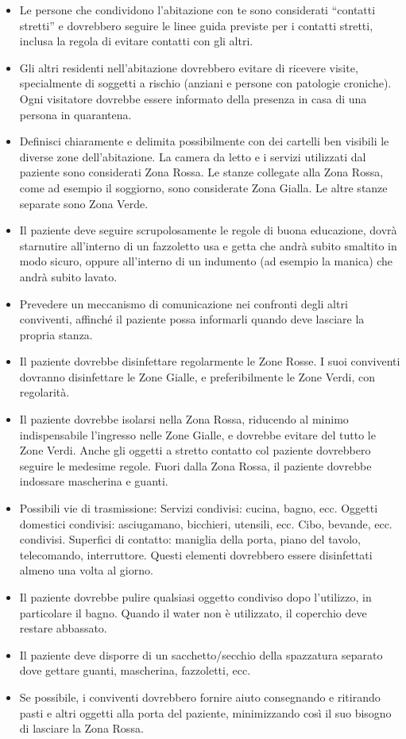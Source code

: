 \documentclass[onecolumn,journal]{IEEEtran}
\begin{document}
\begin{multicols}{2}
\begin{itemize}
  \item Le persone che condividono l’abitazione con te sono considerati “contatti stretti” e dovrebbero seguire le linee guida previste per i contatti stretti, inclusa la regola di evitare contatti con gli altri.
  \item Gli altri residenti nell’abitazione dovrebbero evitare di ricevere visite, specialmente di soggetti a rischio (anziani e persone con patologie croniche). Ogni visitatore dovrebbe essere informato della presenza in casa di una persona in quarantena.
  \item Definisci chiaramente e delimita possibilmente con dei cartelli ben visibili le diverse zone dell’abitazione. La camera da letto e i servizi utilizzati dal paziente sono considerati Zona Rossa. Le stanze collegate alla Zona Rossa, come ad esempio il soggiorno, sono considerate Zona Gialla. Le altre stanze separate sono Zona Verde.
  \item Il paziente deve seguire scrupolosamente le regole di buona educazione, dovrà starnutire all’interno di un fazzoletto usa e getta che andrà subito smaltito in modo sicuro, oppure all’interno di un indumento (ad esempio la manica) che andrà subito lavato.
  \item Prevedere un meccanismo di comunicazione nei confronti degli altri conviventi, affinché il paziente possa informarli quando deve lasciare la propria stanza.
  \item Il paziente dovrebbe disinfettare regolarmente le Zone Rosse. I suoi conviventi dovranno disinfettare le Zone Gialle, e preferibilmente le Zone Verdi, con regolarità.
  \item Il paziente dovrebbe isolarsi nella Zona Rossa, riducendo al minimo indispensabile l’ingresso nelle Zone Gialle, e dovrebbe evitare del tutto le Zone Verdi. Anche gli oggetti a stretto contatto col paziente dovrebbero seguire le medesime regole. Fuori dalla Zona Rossa, il paziente dovrebbe indossare mascherina e guanti.
  \item Possibili vie di trasmissione: Servizi condivisi: cucina, bagno, ecc. Oggetti domestici condivisi: asciugamano, bicchieri, utensili, ecc. Cibo, bevande, ecc. condivisi. Superfici di contatto: maniglia della porta, piano del tavolo, telecomando, interruttore. Questi elementi dovrebbero essere disinfettati almeno una volta al giorno.
  \item Il paziente dovrebbe pulire qualsiasi oggetto condiviso dopo l’utilizzo, in particolare il bagno. Quando il water non è utilizzato, il coperchio deve restare abbassato.
  \item Il paziente deve disporre di un sacchetto/secchio della spazzatura separato dove gettare guanti, mascherina, fazzoletti, ecc.
  \item Se possibile, i conviventi dovrebbero fornire aiuto consegnando e ritirando pasti e altri oggetti alla porta del paziente, minimizzando così il suo bisogno di lasciare la Zona Rossa.


\end{itemize}
\end{multicols}
\end{document}
